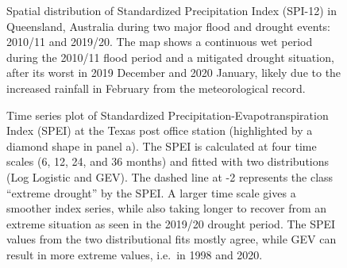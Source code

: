 \documentclass[
]{interact}
\begin{document}
\begin{figure}


\caption{\label{fig-compute-spatial}Spatial distribution of Standardized
Precipitation Index (SPI-12) in Queensland, Australia during two major
flood and drought events: 2010/11 and 2019/20. The map shows a
continuous wet period during the 2010/11 flood period and a mitigated
drought situation, after its worst in 2019 December and 2020 January,
likely due to the increased rainfall in February from the meteorological
record.}

\end{figure}%

\begin{figure}


\caption{\label{fig-compute-temporal}Time series plot of Standardized
Precipitation-Evapotranspiration Index (SPEI) at the Texas post office
station (highlighted by a diamond shape in panel a). The SPEI is
calculated at four time scales (6, 12, 24, and 36 months) and fitted
with two distributions (Log Logistic and GEV). The dashed line at -2
represents the class ``extreme drought'' by the SPEI. A larger time
scale gives a smoother index series, while also taking longer to recover
from an extreme situation as seen in the 2019/20 drought period. The
SPEI values from the two distributional fits mostly agree, while GEV can
result in more extreme values, i.e.~in 1998 and 2020.}

\end{figure}%
\end{document}

